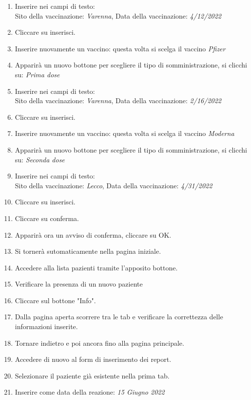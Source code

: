 \documentclass{article}
\begin{document}
\begin{enumerate}
        \item Inserire nei campi di testo:\\
                Sito della vaccinazione: \textit{Varenna}, Data della vaccinazione: \textit{4/12/2022}
        \item Cliccare su inserisci.
        \item Inserire nuovamente un vaccino: questa volta si scelga il vaccino \textit{Pfizer}
        \item Apparirà un nuovo bottone per scegliere il tipo di somministrazione, si clicchi su: \textit{Prima dose}
        \item Inserire nei campi di testo:\\
            Sito della vaccinazione: \textit{Varenna}, Data della vaccinazione: \textit{2/16/2022}
        \item Cliccare su inserisci.
        \item Inserire nuovamente un vaccino: questa volta si scelga il vaccino \textit{Moderna}
        \item Apparirà un nuovo bottone per scegliere il tipo di somministrazione, si clicchi su: \textit{Seconda dose}
        \item Inserire nei campi di testo:\\
            Sito della vaccinazione: \textit{Lecco}, Data della vaccinazione: \textit{4/31/2022}
        \item Cliccare su inserisci.
        \item Cliccare su conferma.
        \item Apparirà ora un avviso di conferma, cliccare su OK.
        \item Si tornerà sutomaticamente nella pagina iniziale. 
        \item Accedere alla lista pazienti tramite l'apposito bottone.
        \item Verificare la presenza di un nuovo paziente
        \item Cliccare sul bottone "Info".
        \item Dalla pagina aperta scorrere tra le tab e verificare la correttezza delle informazioni inserite.
        \item Tornare indietro e poi ancora fino alla pagina principale.
        \item Accedere di nuovo al form di inserimento dei report.
        \item Selezionare il paziente già esistente nella prima tab.
        \item Inserire come data della reazione: \textit{15 Giugno 2022}

\end{enumerate}
\end{document}
